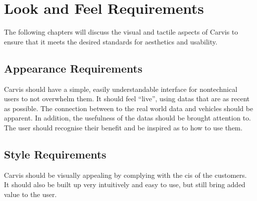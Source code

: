 \chapter{Look and Feel Requirements}
\label{chap:lookandfeel}
The following chapters will discuss the visual and tactile aspects of Carvis to ensure that it meets the desired standards for aesthetics and usability.
\section{Appearance Requirements}
Carvis should have a simple, easily understandable interface for \gls{nontechnical} users to not overwhelm them. It should feel \enquote{live}, using \glspl{data} that are as recent as possible. 
The connection between to the real world data and vehicles should be apparent. In addition, the usefulness of the \glspl{data} should be brought attention to. The user should recognise their benefit and be inspired as to how to use them.

\section{Style Requirements}
Carvis should be visually appealing by complying with the \glspl{ci} of the customers.
It should also be built up very intuitively and easy to use, but still bring added value to the user.